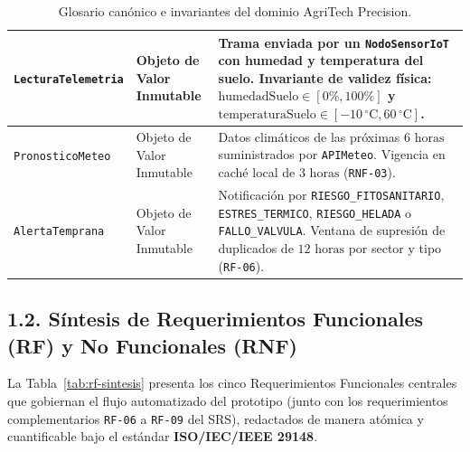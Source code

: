 \documentclass[12pt,letterpaper]{report}
\begin{document}
\begin{table}[H]
\begin{tabularx}{\linewidth}{|L{3.5cm}|L{3.2cm}|Y|}
        \hline
        \texttt{LecturaTelemetria} & Objeto de Valor Inmutable & Trama enviada por un \texttt{NodoSensorIoT} con humedad y temperatura del suelo. Invariante de validez física: $\text{humedadSuelo} \in [0\%, 100\%]$ y $\text{temperaturaSuelo} \in [-10\,^\circ\text{C}, 60\,^\circ\text{C}]$. \\
        \hline
        \texttt{PronosticoMeteo} & Objeto de Valor Inmutable & Datos climáticos de las próximas $6\text{ horas}$ suministrados por \texttt{APIMeteo}. Vigencia en caché local de $3\text{ horas}$ (\texttt{RNF-03}). \\
        \hline
        \texttt{AlertaTemprana} & Objeto de Valor Inmutable & Notificación por \texttt{RIESGO\_FITOSANITARIO}, \texttt{ESTRES\_TERMICO}, \texttt{RIESGO\_HELADA} o \texttt{FALLO\_VALVULA}. Ventana de supresión de duplicados de $12\text{ horas}$ por sector y tipo (\texttt{RF-06}). \\
        \hline
    \end{tabularx}
    \caption{Glosario canónico e invariantes del dominio AgriTech Precision.}
    \label{tab:glosario}
\end{table}

\subsection*{1.2. Síntesis de Requerimientos Funcionales (RF) y No Funcionales (RNF)}

La Tabla~\ref{tab:rf-sintesis} presenta los cinco Requerimientos Funcionales centrales que gobiernan el flujo automatizado del prototipo (junto con los requerimientos complementarios \texttt{RF-06} a \texttt{RF-09} del SRS), redactados de manera atómica y cuantificable bajo el estándar \textbf{ISO/IEC/IEEE 29148}.
\end{document}

